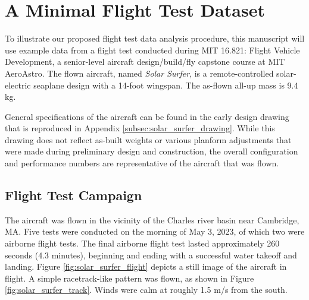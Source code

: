 \documentclass[conf]{new-aiaa}
\begin{document}
    \section{A Minimal Flight Test Dataset}

    To illustrate our proposed flight test data analysis procedure, this manuscript will use example data from a flight test conducted during MIT 16.821: Flight Vehicle Development, a senior-level aircraft design/build/fly capstone course at MIT AeroAstro. The flown aircraft, named \emph{Solar Surfer}, is a remote-controlled solar-electric seaplane design with a 14-foot wingspan. The as-flown all-up mass is 9.4 kg.

    General specifications of the aircraft can be found in the early design drawing that is reproduced in Appendix \ref{subsec:solar_surfer_drawing}. While this drawing does not reflect as-built weights or various planform adjustments that were made during preliminary design and construction, the overall configuration and performance numbers are representative of the aircraft that was flown.

    \subsection{Flight Test Campaign}

    The aircraft was flown in the vicinity of the Charles river basin near Cambridge, MA. Five tests were conducted on the morning of May 3, 2023, of which two were airborne flight tests. The final airborne flight test lasted approximately 260 seconds (4.3 minutes), beginning and ending with a successful water takeoff and landing. Figure \ref{fig:solar_surfer_flight} depicts a still image of the aircraft in flight. A simple racetrack-like pattern was flown, as shown in Figure \ref{fig:solar_surfer_track}. Winds were calm at roughly 1.5 m/s from the south.
\end{document}
